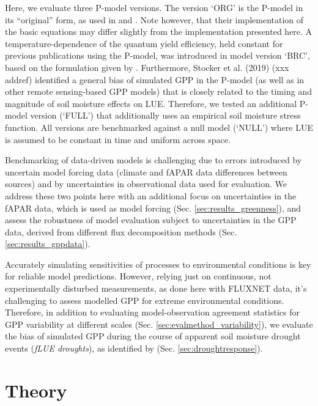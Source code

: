 \documentclass{myreport}
\begin{document}
Here, we evaluate three P-model versions. The version `ORG' is the P-model in its ``original'' form, as used in \cite{wang17natpl} and \cite{keenan17natcomm}. Note however, that their implementation of the basic equations may differ slightly from the implementation presented here. A temperature-dependence of the quantum yield efficiency, held constant for previous publications using the P-model, was introduced in model version `BRC', based on the formulation given by \cite{bernacchi03pce}. Furthermore, Stocker et al. (2019) (xxx addref) identified a general bias of simulated GPP in the P-model (as well as in other remote sensing-based GPP models) that is closely related to the timing and magnitude of soil moisture effects on LUE. Therefore, we tested an additional P-model version (`FULL') that additionally uses an empirical soil moisture stress function. All versions are benchmarked against a null model (`NULL') where LUE is assumed to be constant in time and uniform across space. %

Benchmarking of data-driven models is challenging due to errors introduced by uncertain model forcing data \citep{ryu19rse} (climate and fAPAR data differences between sources) and by uncertainties in observational data used for evaluation. We address these two points here with an additional focus on uncertainties in the fAPAR data, which is used as model forcing (Sec. \ref{sec:results_greenness}), and assess the robustness of model evaluation subject to uncertainties in the GPP data, derived from different flux decomposition methods (Sec. \ref{sec:results_gppdata}). 

Accurately simulating sensitivities of processes to environmental conditions is key for reliable model predictions. However, relying just on continuous, not experimentally disturbed measurements, as done here with FLUXNET data, it's challenging to assess modelled GPP for extreme environmental conditions. Therefore, in addition to evaluating model-observation agreement statistics for GPP variability at different scales (Sec. \ref{sec:evalmethod_variability}), we evaluate the bias of simulated GPP during the course of apparent soil moisture drought events (\textit{fLUE droughts}), as identified by \cite{stocker18newphyt} (Sec. \ref{sec:droughtresponse}).

\section{Theory}
\label{sec:theory}
\end{document}

